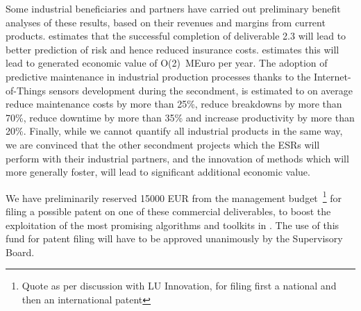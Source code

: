 Some industrial beneficiaries and partners have carried
out preliminary benefit analyses of these results,
based on their revenues and margins from current products.
\dq estimates that
the successful completion of deliverable 2.3 will lead to better
prediction of risk and hence reduced insurance costs. \dq estimates 
this will lead to generated economic value of O(2)~MEuro per year. 
The adoption of predictive maintenance in industrial production processes
thanks to the  Internet-of-Things sensors development during the \lightbox secondment, 
is estimated to on average reduce maintenance costs by more than 25\%, reduce breakdowns by more
than 70\%, reduce downtime by more than 35\% and increase productivity
by more than 20\%. 
Finally, while we cannot quantify all industrial products in the same way,
we are convinced that the other secondment projects which the
ESRs will perform with their industrial partners, and the innovation of methods which
\acronym will more generally foster, will lead to significant additional economic value.

We have preliminarily reserved 15000 EUR 
from the management budget~\footnote{Quote as per discussion
with LU Innovation, for filing first a national and then an 
international patent} for filing a possible patent on one of these
commercial deliverables, to boost the exploitation of the most promising algorithms
and toolkits in \acronym. The use of this fund for patent filing
will have to be approved unanimously by the Supervisory Board. 
